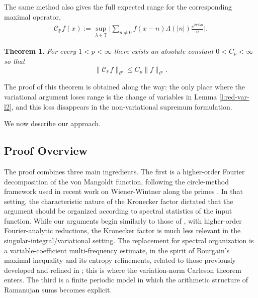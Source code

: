 \documentclass[12pt]{amsart}
\numberwithin{equation}{section}
\newtheorem{theorem}{Theorem}[section]
\theoremstyle{definition}
\begin{document}
The same method also gives the full expected range for the corresponding maximal operator,
\begin{align}\label{e:CP}
\mathcal{C}_{\mathbb{P}} f(x):=\sup_{\lambda\in\mathbb T}
\big|\sum_{n\neq0} f(x-n)\Lambda(|n|)
\frac{e^{2 \pi i \lambda n}}{n}\big|.
\end{align}

\begin{theorem}\label{t:carmax}
For every \(1<p<\infty\) there exists an absolute constant $0 < C_p < \infty$ so that 
\[
\|\mathcal{C}_{\mathbb{P}} f\|_{\ell^p}\leq C_p \|f\|_{\ell^p}.
\]
\end{theorem}
The proof of this theorem is obtained along the way: the only place where the variational argument loses range is the change of variables in Lemma \ref{l:red-var-l2}, and this loss disappears in the non-variational supremum formulation.

\bigskip

We now describe our approach.

\subsection{Proof Overview}\label{ss:sketch}

The proof combines three main ingredients.  The first is a higher-order Fourier
decomposition of the von Mangoldt function, following the circle-method framework
used in recent work on Wiener-Wintner along the primes
\cite{F+}. In that setting, the characteristic nature of the Kronecker factor dictated that the argument should be organized according to spectral statistics of the input function. While our arguments begin similarly to those of \cite{F+}, with higher-order Fourier-analytic reductions, the Kronecker factor is much less relevant in the singular-integral/variational setting. The replacement for spectral organization is a variable-coefficient multi-frequency estimate, in the
spirit of Bourgain's maximal inequality \cite{B2} and its entropy refinements, related to those previously developed and refined in \cite{GZK,KWW}; this
is where the variation-norm Carleson theorem enters.  The third is a finite
periodic model in which the arithmetic structure of Ramanujan sums becomes
explicit.
\end{document}
